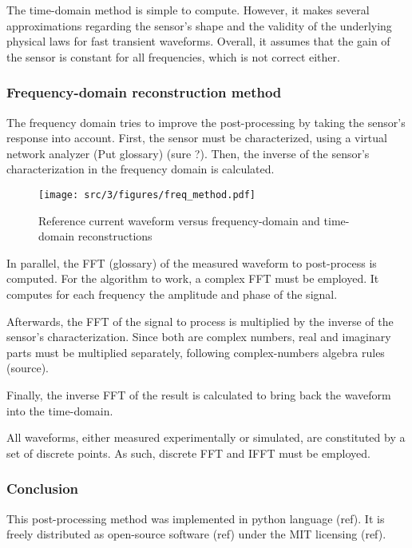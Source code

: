 The time-domain method is simple to compute.
However, it makes several approximations regarding the sensor's shape and the validity of the underlying physical laws for fast transient waveforms.
Overall, it assumes that the gain of the sensor is constant for all frequencies, which is not correct either.

\subsubsection{Frequency-domain reconstruction method}

The frequency domain tries to improve the post-processing by taking the sensor's response into account.
First, the sensor must be characterized, using a virtual network analyzer (Put glossary) (sure ?).
Then, the inverse of the sensor's characterization in the frequency domain is calculated.


\begin{figure}[!htbp]
  \centering
  \texttt{[image: src/3/figures/freq\_method.pdf]}
  \caption{Reference current waveform versus frequency-domain and time-domain reconstructions}
  \label{fig:freq-domain-reconstructed}
\end{figure}

In parallel, the FFT (glossary) of the measured waveform to post-process is computed.
For the algorithm to work, a complex FFT must be employed.
It computes for each frequency the amplitude and phase of the signal.

Afterwards, the FFT of the signal to process is multiplied by the inverse of the sensor's characterization.
Since both are complex numbers, real and imaginary parts must be multiplied separately, following complex-numbers algebra rules (source).


Finally, the inverse FFT of the result is calculated to bring back the waveform into the time-domain.

All waveforms, either measured experimentally or simulated, are constituted by a set of discrete points.
As such, discrete FFT and IFFT must be employed.


\subsubsection{Conclusion}


This post-processing method was implemented in python language (ref).
It is freely distributed as open-source software (ref) under the MIT licensing (ref).
